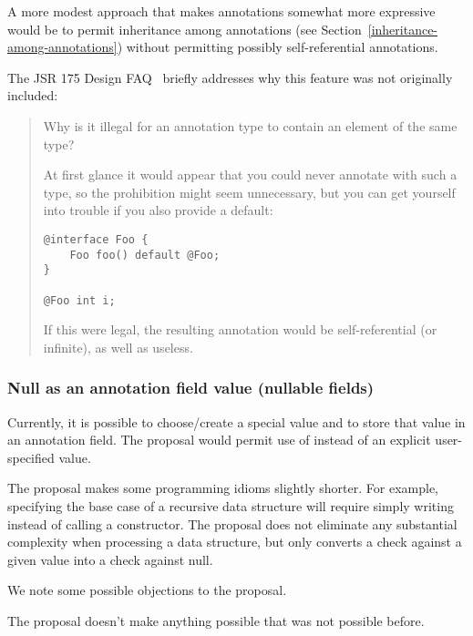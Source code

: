 \documentclass[10pt]{article}
\begin{document}


A more modest approach that makes annotations somewhat more expressive
would be to permit inheritance among annotations (see
Section~\ref{inheritance-among-annotations}) without permitting possibly
self-referential annotations.


The JSR 175 Design FAQ~\cite{JSR175-PFD2} briefly addresses why this
feature was not originally included:

\begin{quote}
  Why is it illegal for an annotation type to contain an element of the same type?

At first glance it would appear that you could never annotate with such a type, so the prohibition might seem unnecessary, but you can get yourself into trouble if you also provide a default:

\begin{Verbatim}
@interface Foo {
    Foo foo() default @Foo;
}

@Foo int i;
\end{Verbatim}

If this were legal, the resulting annotation would be self-referential (or
infinite), as well as useless.
\end{quote}


\subsubsection{Null as an annotation field value (nullable fields)\label{nullable-members}}

Currently, it is possible to choose/create a special value and to store
that value in an annotation field.
The proposal would permit use of  instead of an explicit
user-specified value.

The proposal makes some programming idioms slightly shorter.  For example,
specifying the base case of a recursive data structure will require simply
writing  instead of calling a constructor.  The proposal does
not eliminate any substantial complexity when processing a data structure,
but only converts a check against a given value into a check against null.

We note some possible objections to the proposal.

The proposal doesn't make anything possible that was not possible before.
\end{document}
